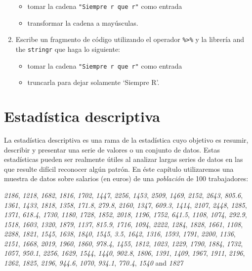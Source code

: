 \documentclass[
]{book}
\providecommand{\tightlist}{%
  \setlength{\itemsep}{0pt}\setlength{\parskip}{0pt}}
\begin{document}
\begin{enumerate}
  \begin{itemize}
  \tightlist
  \item
    tomar la cadena \texttt{"Siempre\ r\ que\ r"} como entrada
  \item
    transformar la cadena a mayúsculas.
  \end{itemize}
\item
  Escribe un fragmento de código utilizando el operador \texttt{\%\textgreater{}\%} y la librería and the \texttt{stringr} que haga lo siguiente:

  \begin{itemize}
  \tightlist
  \item
    tomar la cadena \texttt{"Siempre\ r\ que\ r"} como entrada
  \item
    truncarla para dejar solamente `Siempre R'.
  \end{itemize}
\end{enumerate}

\hypertarget{estaduxedstica-descriptiva}{%
\chapter{Estadística descriptiva}\label{estaduxedstica-descriptiva}}

La estadística descriptiva es una rama de la estadística cuyo objetivo es resumir, describir y presentar una serie de valores o un conjunto de datos. Estas estadísticas pueden ser realmente útiles al analizar largas series de datos en las que resulte difícil reconocer algún patrón. En éste capítulo utilizaremos una muestra de datos sobre salarios (en euros) de una \emph{población} de 100 trabajadores:

\emph{2186}, \emph{1218}, \emph{1682}, \emph{1816}, \emph{1702}, \emph{1447}, \emph{2256}, \emph{1453}, \emph{2509}, \emph{1469}, \emph{2152}, \emph{2643}, \emph{805.6}, \emph{1361}, \emph{1433}, \emph{1818}, \emph{1358}, \emph{171.8}, \emph{279.8}, \emph{2160}, \emph{1347}, \emph{609.3}, \emph{1414}, \emph{2107}, \emph{2448}, \emph{1285}, \emph{1371}, \emph{618.4}, \emph{1730}, \emph{1180}, \emph{1728}, \emph{1852}, \emph{2018}, \emph{1196}, \emph{1752}, \emph{641.5}, \emph{1108}, \emph{1074}, \emph{292.9}, \emph{1518}, \emph{1603}, \emph{1320}, \emph{1879}, \emph{1137}, \emph{815.9}, \emph{1716}, \emph{1094}, \emph{2222}, \emph{1284}, \emph{1828}, \emph{1661}, \emph{1108}, \emph{2288}, \emph{1821}, \emph{1545}, \emph{1638}, \emph{1840}, \emph{1545}, \emph{3.5}, \emph{1642}, \emph{1316}, \emph{1593}, \emph{1791}, \emph{2200}, \emph{1136}, \emph{2151}, \emph{1668}, \emph{2019}, \emph{1960}, \emph{1860}, \emph{978.4}, \emph{1455}, \emph{1812}, \emph{1023}, \emph{1229}, \emph{1790}, \emph{1884}, \emph{1732}, \emph{1057}, \emph{950.1}, \emph{2256}, \emph{1629}, \emph{1544}, \emph{1440}, \emph{902.8}, \emph{1806}, \emph{1391}, \emph{1409}, \emph{1967}, \emph{1911}, \emph{2196}, \emph{1262}, \emph{1825}, \emph{2196}, \emph{944.6}, \emph{1070}, \emph{934.1}, \emph{770.4}, \emph{1540} and \emph{1827}
\end{document}
